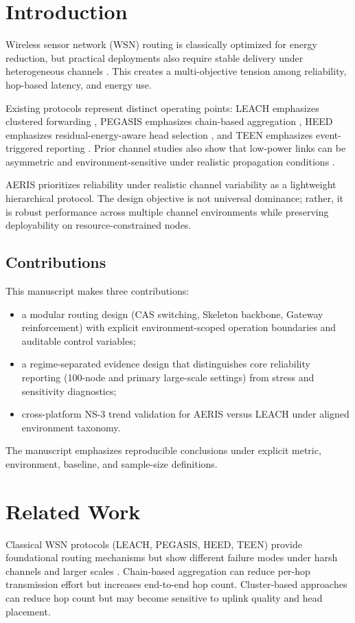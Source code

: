 ﻿\documentclass[sensors,article,submit,moreauthors,pdftex]{Definitions/mdpi}
\begin{document}
\section{Introduction}
Wireless sensor network (WSN) routing is classically optimized for energy reduction, but practical deployments also require stable delivery under heterogeneous channels \cite{Akyildiz2002Survey,Rault2016Energy,Kandris2020}. This creates a multi-objective tension among reliability, hop-based latency, and energy use.

Existing protocols represent distinct operating points: LEACH emphasizes clustered forwarding \cite{Heinzelman2000LEACH}, PEGASIS emphasizes chain-based aggregation \cite{Lindsey2002PEGASIS}, HEED emphasizes residual-energy-aware head selection \cite{Younis2004HEED}, and TEEN emphasizes event-triggered reporting \cite{Manjeshwar2001TEEN}. Prior channel studies also show that low-power links can be asymmetric and environment-sensitive under realistic propagation conditions \cite{Zuniga2004,Zuniga2007Asymmetry,Baccour2012RLQE}.

AERIS prioritizes reliability under realistic channel variability as a lightweight hierarchical protocol. The design objective is not universal dominance; rather, it is robust performance across multiple channel environments while preserving deployability on resource-constrained nodes.

\subsection{Contributions}
This manuscript makes three contributions:
\begin{itemize}
\item a modular routing design (CAS switching, Skeleton backbone, Gateway reinforcement) with explicit environment-scoped operation boundaries and auditable control variables;
\item a regime-separated evidence design that distinguishes core reliability reporting (100-node and primary large-scale settings) from stress and sensitivity diagnostics;
\item cross-platform NS-3 trend validation for AERIS versus LEACH under aligned environment taxonomy.
\end{itemize}
The manuscript emphasizes reproducible conclusions under explicit metric, environment, baseline, and sample-size definitions.

\section{Related Work}
Classical WSN protocols (LEACH, PEGASIS, HEED, TEEN) provide foundational routing mechanisms but show different failure modes under harsh channels and larger scales \cite{Heinzelman2002LEACH,Lindsey2002PEGASIS,Younis2004HEED,Kandris2020}. Chain-based aggregation can reduce per-hop transmission effort but increases end-to-end hop count. Cluster-based approaches can reduce hop count but may become sensitive to uplink quality and head placement.
\end{document}
